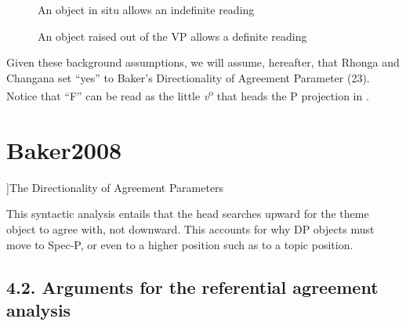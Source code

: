 \documentclass[output=paper]{langsci/langscibook}
\begin{document}
\z

\begin{stylecaption}\begin{figure}
\caption{An object in situ allows an indefinite reading}
\label{fig:1}
\end{figure}\end{stylecaption}

  
 

\begin{stylecaption}\begin{figure}
\caption{An object raised out of the VP allows a definite reading}
\label{fig:2}
\end{figure}\end{stylecaption}

Given these background assumptions, we will assume, hereafter, that Rhonga and Changana set “yes” to Baker’s Directionality of Agreement Parameter (23). Notice that “F” can be read as the little \textit{v}\textsuperscript{o} that heads the P projection in .

\chapter[The Directionality of Agreement Parameters \citep[155]{Baker2008}]{The Directionality of Agreement Parameters \citep[155]{Baker2008}}
\label{bkm:Ref455885353}

This syntactic analysis entails that the head  searches upward for the theme object to agree with, not downward. This accounts for why DP objects must move to Spec-P, or even to a higher position such as to a topic position.

\section{4.2. Arguments for the referential agreement analysis}
\end{document}
